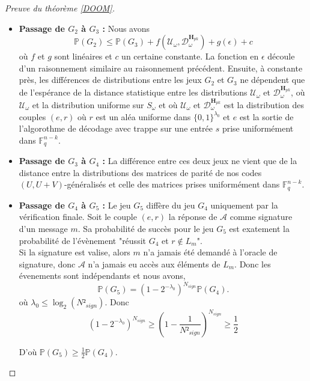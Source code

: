 \documentclass[12pt]{article}
\theoremstyle{plain}
\newtheorem{propo}[thm]{Proposition}
\theoremstyle{definition}
\newcommand{\F}{\mathbb{F}}
\newcommand{\e}{\mathbf{e}}
\begin{document}
\begin{appendix}
\begin{proof}[Preuve du théorème \ref{DOOM}]
\begin{itemize}
\begin{equation}
\begin{split}
&\leq \mathbb{E}_{\mathbf{H}_{pk}}(\rho(X_1,...,X_{N_{hash}},Y_1,...,Y_{N_{hash}}))\\
\end{split}
\end{equation}
\begin{propo} Soit $X$ la distribution uniforme dans $\F_q^{n-k}$ et $Y$ la distribution de $\e\mathbf{H}^T$ avec $e$ uniformément distribué dans $S_{\omega}$. Alors
$$\mathbb{E}_{H_{pk}}(\rho(X,Y)) \leq \frac{1}{2}\sqrt{\epsilon} $$
où $\epsilon$ est une borne qui décroit exponentiellement avec $n$.
\end{propo}
Par les deux propositions précédentes et par un raisonnement par récurrence, on termine la preuve. 
\item \textbf{Passage de $G_2$ à $G_3$ : } Nous avons
$$ \mathbb{P}(G_2) \leq  \mathbb{P}(G_3) + f(\mathcal{U}_{\omega},\mathcal{D}_{\omega}^{\mathbf{H}_{pk}}) + g(\epsilon) + c$$
où $f$ et $g$ sont linéaires et $c$ un certaine constante.
La fonction en $\epsilon$ découle d'un raisonnement similaire au raisonnement précédent. Ensuite, à constante près, les différences de distributions entre les jeux $G_2$ et $G_3$ ne dépendent que de l'espérance de la distance statistique entre les distributions $\mathcal{U}_{\omega}$ et $\mathcal{D}_{\omega}^{\mathbf{H}_{pk}}$, où $\mathcal{U}_{\omega}$ et la distribution uniforme sur $S_{\omega}$ et où $\mathcal{U}_{\omega}$ et $\mathcal{D}_{\omega}^{\mathbf{H}_{pk}}$ est la distribution des couples $(e,r)$ où $r$ est un aléa uniforme dans $\{0,1\}^{\lambda_0}$ et $e$ est la sortie de l'algorothme de décodage avec trappe sur une entrée $s$ prise uniformément dans $\F_q^{n-k}$.
\item \textbf{Passage de $G_3$ à $G_4$ : } La différence entre ces deux jeux ne vient que de la distance entre la distributions des matrices de parité de nos codes $(U,U+V)$-généralisés et celle des matrices prises uniformément dans $\F_q^{n-k}$.
\item \textbf{Passage de $G_4$ à $G_5$ : } Le jeu $G_5$ diffère du jeu $G_4$ uniquement par la vérification finale. Soit le couple $(e,r)$ la réponse de $\mathcal{A}$ comme signature d'un message $m$. Sa probabilité de succès pour le jeu $G_5$ est exatement la probabilité de l'évènement "réussit $G_4$ et $r\notin L_m$".  \\
Si la signature est valise, alors $m$ n'a jamais été demandé à l'oracle de signature, donc $\mathcal{A}$ n'a jamais eu accès aux éléments de $L_m$. Donc les évenements sont indépendants et nous avons,
$$\mathbb{P}(G_5) = (1 - 2^{- \lambda_0})^{N_{sign}}\mathbb{P}(G_4).$$
où $\lambda_0 \leq \log_2(N²_{sign})$. Donc
$$(1-2^{-\lambda_0})^{N_{sign}} \geq (1-\frac{1}{N²_{sign}})^{N_{sign}} \geq \frac{1}{2} $$

D'où $\mathbb{P}(G_5) \geq\frac{1}{2}\mathbb{P}(G_4)$.
\end{itemize}

\end{proof}


\end{appendix}



\end{document}
